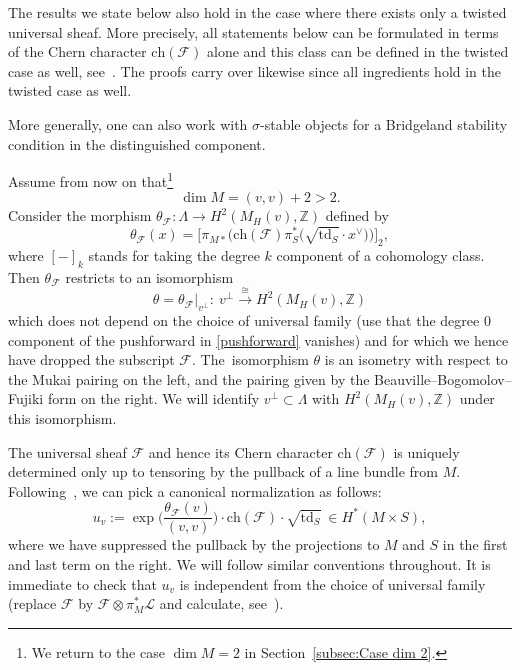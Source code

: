 \documentclass[pdftex]{sigma}
\numberwithin{equation}{section}
\newcommand{\BZ}{{\mathbb{Z}}}
\newcommand{\CF}{{\mathcal F}}
\newcommand{\CL}{{\mathcal L}}
\newcommand{\ch}{{\mathrm{ch}}}
\newcommand{\td}{{\mathrm{td}}}
\newcommand{\1}{\mathsf{1}}
\begin{document}
\begin{rmk} \label{rmk:twisted universal sheaf}
The results we state below also hold in the case where there exists only a twisted universal sheaf.
More precisely, all statements below can be formulated
in terms of the Chern character $\ch(\CF)$ alone and this class can be defined in the twisted case as well, see~\cite[Section~3]{MarkmanGenerators}.
The proofs carry over likewise since all ingredients hold in the twisted case as well. %
\end{rmk}
\begin{rmk}
More generally, one can also work with $\sigma$-stable objects for a Bridgeland stability condition in the distinguished component.
\end{rmk}

Assume from now on that\footnote{We return to the case $\dim M = 2$ in Section~\ref{subsec:Case dim 2}.}
\[
\dim M = (v,v) + 2 > 2.
\]
Consider the morphism $\theta_{\CF} \colon \Lambda \to H^2(M_H(v),\BZ)$ defined by
\begin{equation}
\theta_{\CF}(x) = \big[ \pi_{M \ast}\big( \ch(\CF)
\pi_S^{\ast}\big( \sqrt{\td_S} \cdot x^{\vee}  \big) \big) \big]_{2},
\label{pushforward} \end{equation}
where $[ - ]_{k}$ stands for taking the degree $k$ component of a cohomology class.
Then $\theta_{\CF}$ restricts to an isomorphism
\begin{equation}
\theta = \theta_{\CF}|_{v^{\perp}} \colon \ v^{\perp} \xrightarrow{\cong} H^2(M_H(v),\BZ) \label{identification}
\end{equation}
which does not depend on the choice of universal family (use that the degree $0$ component of the pushforward in \eqref{pushforward} vanishes)
and for which we hence have dropped the subscript $\CF$.
The~isomorphism $\theta$ is an isometry with respect to the Mukai pairing on the left, and the pairing given by the Beauville--Bogomolov--Fujiki form on the right.
We will identify $v^{\perp} \subset \Lambda$ with $H^2(M_{H}(v),\BZ)$ under this isomorphism.

The universal sheaf $\CF$ and hence its Chern character $\ch(\CF)$ is uniquely determined only up to tensoring by the pullback of a line bundle from $M$.
Following~\cite{Markman}, we can pick a canonical normalization as follows:
\[
u_v := \exp\bigg( \frac{\theta_{\CF}(v) }{(v,v)} \bigg) \cdot \ch(\CF) \cdot \sqrt{\td_S} \ \in H^{\ast}(M \times S),
\]
where we have suppressed the pullback by the projections to $M$ and $S$ in the first and last term on the right.
We will follow similar conventions throughout.
It is immediate to check that $u_v$ is independent from the choice of universal family (replace $\CF$ by $\CF \otimes \pi_M^{\ast} \CL$ and calculate, see~\cite[Lemma~3.1]{Markman}).
\end{document}
